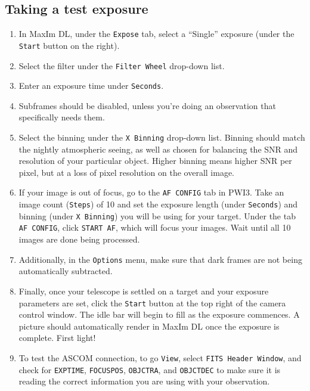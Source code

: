\documentclass{article}
\begin{document}
	\subsection{Taking a test exposure}
	
	\begin{enumerate}
		
		\item In MaxIm DL, under the \texttt{Expose} tab, select a ``Single'' exposure (under the \texttt{Start} button on the right).
		
		\item Select the filter under the \texttt{Filter Wheel} drop-down list.
		
		\item Enter an exposure time under \texttt{Seconds}.
		
		\item Subframes should be disabled, unless you're doing an observation that specifically needs them.
		
		\item Select the binning under the \texttt{X Binning} drop-down list. Binning should match the nightly atmospheric seeing, as well as chosen for balancing the SNR and resolution of your particular object. Higher binning means higher SNR per pixel, but at a loss of pixel resolution on the overall image.
		
		\item If your image is out of focus, go to the \texttt{AF CONFIG} tab in PWI3. Take an image count (\texttt{Steps}) of 10 and set the exposure length (under \texttt{Seconds}) and binning (under \texttt{X Binning}) you will be using for your target. Under the tab \texttt{AF CONFIG}, click \texttt{START AF}, which will focus your images. Wait until all 10 images are done being processed.
		
		\item Additionally, in the \texttt{Options} menu, make sure that dark frames are not being automatically subtracted.
		
		\item Finally, once your telescope is settled on a target and your exposure parameters are set, click the \texttt{Start} button at the top right of the camera control window. The idle bar will begin to fill as the exposure commences. A picture should automatically render in MaxIm DL once the exposure is complete. First light!
		
		\item To test the ASCOM connection, to go \texttt{View}, select \texttt{FITS Header Window}, and check for \texttt{EXPTIME}, \texttt{FOCUSPOS}, \texttt{OBJCTRA}, and \texttt{OBJCTDEC} to make sure it is reading the correct information you are using with your observation. 
		
	\end{enumerate}
	
\end{document}
